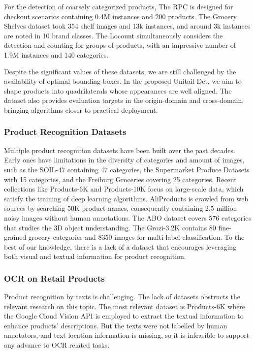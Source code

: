 \documentclass[runningheads]{llncs}
\begin{document}
For the detection of coarsely categorized products, The RPC \cite{rpc} is designed for checkout scenarios containing 0.4M instances and 200 products. The Grocery Shelves dataset \cite{Grocery_shelves} took 354 shelf images and 13k instances, and around 3k instances are noted in 10 brand classes. The Locount \cite{locount} simultaneously considers the detection and counting for groups of products, with an impressive number of 1.9M instances and 140 categories.

Despite the significant values of these datasets, we are still challenged by the availability of optimal bounding boxes. In the proposed Unitail-Det, we aim to shape products into quadrilaterals whose appearances are well aligned. The dataset also provides evaluation targets in the origin-domain and cross-domain, bringing algorithms closer to practical deployment. 

\subsubsection{Product Recognition Datasets}
Multiple product recognition datasets have been built over the past decades. Early ones have limitations in the diversity of categories and amount of images, such as the SOIL-47 \cite{SOIL-47} containing 47 categories, the Supermarket Produce Datasets  \cite{Supermarket2010} with 15 categories, and the Freiburg Groceries \cite{Freiburg_Groceries} covering 25 categories. Recent collections like Products-6K\cite{products-6k} and Products-10K\cite{products-10k} focus on large-scale data, which satisfy the training of deep learning algorithms. 
AliProducts\cite{AliProduct} is crawled from web sources by searching 50K product names, consequently containing 2.5 million noisy images without human annotations. The ABO\cite{ABO_dataset} dataset covers 576 categories that studies the 3D object understanding. The Grozi-3.2K \cite{Grozi-3.2k} contains 80 fine-grained grocery categories and 8350 images for multi-label classification.
To the best of our knowledge, there is a lack of a dataset that encourages leveraging both visual and textual information for product recognition. 

\subsubsection{OCR on Retail Products}
Product recognition by texts is challenging. The lack of datasets obstructs the relevant research on this topic. The most relevant dataset is Products-6K\cite{products-6k} where the Google Cloud Vision API is employed to extract the textual information to enhance products' descriptions. But the texts were not labelled by human annotators, and text location information is missing, so it is infeasible to support any advance to OCR related tasks. 
\end{document}
